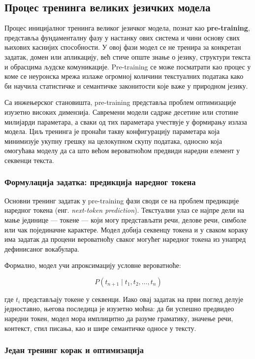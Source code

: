 \subsection{Процес тренинга великих језичких модела}

Процес иницијалног тренинга великог језичког модела, познат као \textbf{pre-training}, представља фундаменталну фазу у настанку ових система и чини основу свих њихових каснијих способности. У овој фази модел се не тренира за конкретан задатак, домен или апликацију, већ стиче опште знање о језику, структури текста и обрасцима људске комуникације. Pre-training се може посматрати као процес у коме се неуронска мрежа излаже огромној количини текстуалних података како би научила статистичке и семантичке законитости које важе у природном језику.

Са инжењерског становишта, pre-training представља проблем оптимизације изузетно високих димензија. Савремени модели садрже десетине или стотине милијарди параметара, а сваки од тих параметара учествује у формирању излаза модела. Циљ тренинга је пронаћи такву конфигурацију параметара која минимизује укупну грешку на целокупном скупу података, односно која омогућава моделу да са што већом вероватноћом предвиди наредни елемент у секвенци текста.

\subsubsection{Формулација задатка: предикција наредног токена}

Основни тренинг задатак у pre-training фази своди се на проблем предикције наредног токена (енг. \textit{next-token prediction}). Текстуални улаз се најпре дели на мање јединице — токене — који могу представљати речи, делове речи, симболе или чак појединачне карактере. Модел добија секвенцу токена и у сваком кораку има задатак да процени вероватноћу сваког могућег наредног токена из унапред дефинисаног вокабулара.

Формално, модел учи апроксимацију условне вероватноће:

\[
P(t_{n+1} \mid t_1, t_2, \dots, t_n)
\]

где $t_i$ представљају токене у секвенци. Иако овај задатак на први поглед делује једноставно, његова последица је изузетно моћна: да би успешно предвидео наредни токен, модел мора имплицитно да разуме граматику, значење речи, контекст, стил писања, као и шире семантичке односе у тексту.

\subsubsection{Један тренинг корак и оптимизација}

